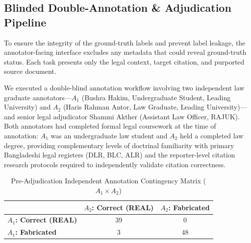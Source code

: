 \documentclass[conference]{IEEEtran}
\begin{document}
\subsection{Blinded Double-Annotation \& Adjudication Pipeline}
To ensure the integrity of the ground-truth labels and prevent label leakage, the annotator-facing interface excludes any metadata that could reveal ground-truth status. Each task presents only the legal context, target citation, and purported source document. 

We executed a double-blind annotation workflow involving two independent law graduate annotators—$A_1$ (Bushra Hakim, Undergraduate Student, Leading University) and $A_2$ (Haris Rahman Antor, Law Graduate, Leading University)—and senior legal adjudicator Shammi Akther (Assistant Law Officer, RAJUK). Both annotators had completed formal legal coursework at the time of annotation: $A_1$ was an undergraduate law student and $A_2$ held a completed law degree, providing complementary levels of doctrinal familiarity with primary Bangladeshi legal registers (DLR, BLC, ALR) and the reporter-level citation research protocols required to independently validate citation correctness.

\begin{table}[htbp]
\caption{Pre-Adjudication Independent Annotation Contingency Matrix ($A_1 \times A_2$)}
\label{tab:annotation_contingency}
\centering
\begin{tabular}{lcc}
\toprule
 & \textbf{$A_2$: Correct (REAL)} & \textbf{$A_2$: Fabricated} \\
\midrule
\textbf{$A_1$: Correct (REAL)} & 39 & 0 \\
\textbf{$A_1$: Fabricated} & 3 & 48 \\
\bottomrule
\end{tabular}
\end{table}
\end{document}
